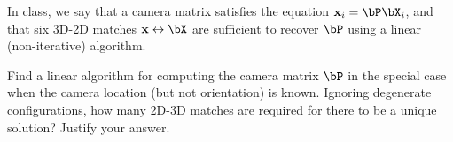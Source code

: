 \begin{problem}
  In class, we say that a camera matrix satisfies the equation
  $\bx_i = \bP \bX_i$, and that six 3D-2D matches $\bx \leftrightarrow \bX$
  are sufficient to recover $\bP$ using a linear (non-iterative) algorithm.

  \step
  Find a linear algorithm for computing the camera matrix $\bP$
  in the special case when the camera location (but not orientation)
  is known. Ignoring degenerate configurations, how many 2D-3D matches
  are required for there to be a unique solution?
  Justify your answer.
\end{problem}

\begin{answer}
  
\end{answer}
